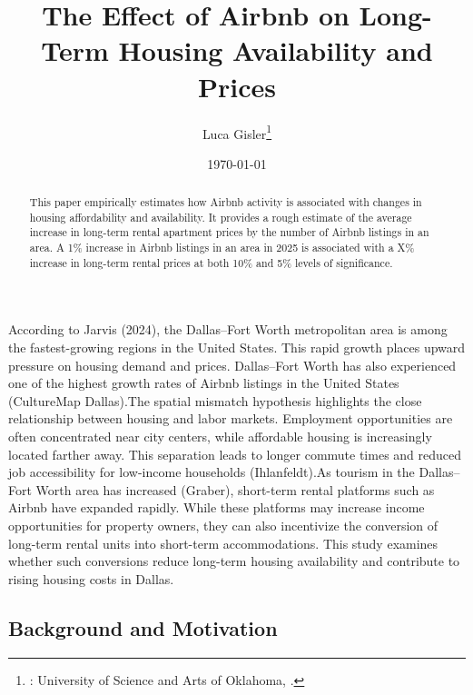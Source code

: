 \documentclass[Department of Economics]{AEA}
\begin{document}
\title{The Effect of Airbnb on Long-Term Housing Availability and
Prices}


\author{
  Luca Gisler\thanks{
  : University of Science and Arts of Oklahoma, \href{mailto:}{}.
}
}

\date{\today}
\pubVolume{}
\pubIssue{}
\JEL{}

\begin{abstract}
This paper empirically estimates how Airbnb activity is associated with
changes in housing affordability and availability. It provides a rough
estimate of the average increase in long-term rental apartment prices by
the number of Airbnb listings in an area. A 1\% increase in Airbnb
listings in an area in 2025 is associated with a X\% increase in
long-term rental prices at both 10\% and 5\% levels of significance.
\end{abstract}


\maketitle

According to Jarvis (2024), the Dallas--Fort Worth metropolitan area is
among the fastest-growing regions in the United States. This rapid
growth places upward pressure on housing demand and prices. Dallas--Fort
Worth has also experienced one of the highest growth rates of Airbnb
listings in the United States (CultureMap Dallas).The spatial mismatch
hypothesis highlights the close relationship between housing and labor
markets. Employment opportunities are often concentrated near city
centers, while affordable housing is increasingly located farther away.
This separation leads to longer commute times and reduced job
accessibility for low-income households (Ihlanfeldt).As tourism in the
Dallas--Fort Worth area has increased (Graber), short-term rental
platforms such as Airbnb have expanded rapidly. While these platforms
may increase income opportunities for property owners, they can also
incentivize the conversion of long-term rental units into short-term
accommodations. This study examines whether such conversions reduce
long-term housing availability and contribute to rising housing costs in
Dallas.

\subsection{Background and Motivation}\label{background-and-motivation}
\end{document}
